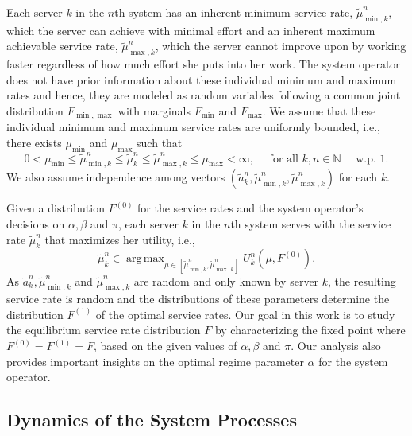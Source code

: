 \documentclass[a4paper,11pt,twoside]{article}
\numberwithin{equation}{section}
\numberwithin{figure}{section}
\theoremstyle{plain}
\newcommand{\NN}{\mathbb{N}}
\DeclareMathOperator*{\argmax}{arg\,max}
\newcommand{\1}{\mathbbm{1}}
\begin{document}
Each server $k$ in the $n$th system has an inherent minimum service rate, $\tilde{\mu}_{{\min},k}^n$, which the  server can achieve with minimal effort and an inherent maximum achievable service rate, $\tilde{\mu}_{{\max},k}^n$, which the server cannot improve upon by working faster regardless of how much effort she puts into her work. The system operator does not have prior information about these individual minimum and maximum rates and hence, they are modeled as random variables following a common joint distribution $F_{\min,\max}$ with  marginals $F_{\min}$ and $F_{\max}$. We assume that these individual minimum and maximum service rates are uniformly bounded, i.e., there exists $\mu_{\min}$ and $\mu_{\max}$ such that 
 \begin{equation}
     0<\mu_{\min}\leq \tilde{\mu}_{\min,k}^n\leq \tilde{\mu}_k^n\leq \tilde{\mu}_{\max,k}^n\leq \mu_{\max}<\infty, \quad \mbox{ for all }k,n\in \NN \quad \mbox{ w.p. }1.\label{eq:boundedrates}
 \end{equation}
We also assume independence among vectors $(\tilde{a}_k^n, \tilde{\mu}_{\min,k}^n, \tilde{\mu}_{\max,k}^n)$ for each $k$. 

\label{par:fixed_point_discussion}Given a distribution $F^{(0)}$ for the service rates and the system operator's decisions on $\alpha, \beta$ and $\pi$, each server $k$ in the $n$th system serves with the service rate $\tilde{\mu}_k^n$ that maximizes her utility, i.e.,  
\begin{equation}
\tilde{\mu}_k^n\in \argmax_{\mu\in[\tilde{\mu}_{{\min},k}^n, \tilde{\mu}_{{\max},k}^n]}U_k^n(\mu, F^{(0)}).\label{eq:mu_update_equation}
\end{equation}
As $\tilde{a}_k^n, \tilde{\mu}_{{\min},k}^n$ and $\tilde{\mu}_{{\max},k}^n$ are random and only known by server $k$, the resulting service rate is random and the distributions of these parameters determine the distribution $F^{(1)}$ of the  optimal service rates. Our goal in this work is to study the equilibrium service rate distribution $F$ by characterizing the fixed point where $F^{(0)}=F^{(1)}=F$, based on the given values of $\alpha, \beta$ and $\pi$. Our analysis also provides important insights on the optimal regime parameter $\alpha$ for the system operator. 

\subsection{Dynamics of the System Processes}\label{sec:systemdynamics}
\end{document}
